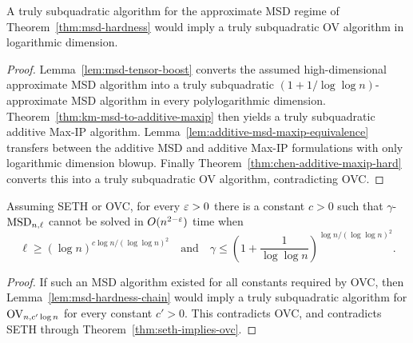 \begin{lemma}
  \label{lem:msd-hardness-chain}
  A truly subquadratic algorithm for the approximate MSD regime of
  Theorem~\ref{thm:msd-hardness} would imply a truly subquadratic OV algorithm
  in logarithmic dimension.
\end{lemma}
\begin{proof}
  Lemma~\ref{lem:msd-tensor-boost} converts the assumed high-dimensional
  approximate MSD algorithm into a truly subquadratic
  $(1+1/\log\log n)$-approximate MSD algorithm in every polylogarithmic
  dimension.  Theorem~\ref{thm:km-msd-to-additive-maxip} then yields a truly
  subquadratic additive Max-IP algorithm.  Lemma~\ref{lem:additive-msd-maxip-equivalence}
  transfers between the additive MSD and additive Max-IP formulations with only
  logarithmic dimension blowup.  Finally
  Theorem~\ref{thm:chen-additive-maxip-hard} converts this into a truly
  subquadratic OV algorithm, contradicting OVC.
\end{proof}

\begin{theorem}
  \label{thm:msd-hardness}
  Assuming SETH or OVC, for every $\varepsilon>0$ there is a constant $c>0$ such that
  $\gamma$-$\mathrm{MSD}_{n,\ell}$ cannot be solved in $O(n^{2-\varepsilon})$ time when
  \[
    \ell \geq (\log n)^{c\log n/(\log\log n)^2}
    \quad\text{and}\quad
    \gamma \leq \left(1+\frac1{\log\log n}\right)^{\log n/(\log\log n)^2}.
  \]
\end{theorem}
\begin{proof}
  If such an MSD algorithm existed for all constants required by OVC, then
  Lemma~\ref{lem:msd-hardness-chain} would imply a truly subquadratic algorithm
  for $\mathrm{OV}_{n,c'\log n}$ for every constant $c'>0$.  This contradicts OVC, and
  contradicts SETH through Theorem~\ref{thm:seth-implies-ovc}.
\end{proof}

